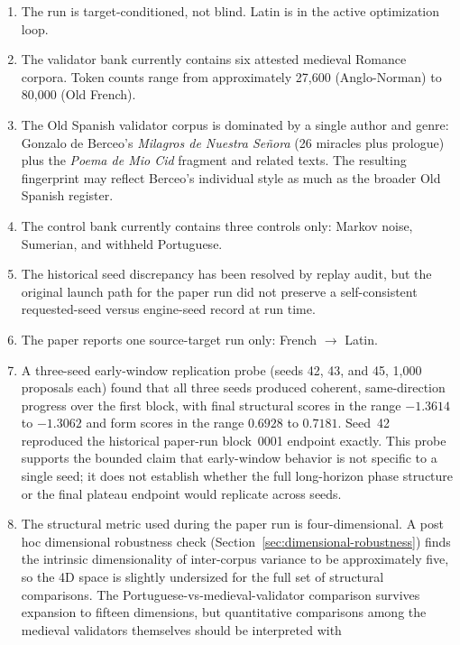 \documentclass[11pt]{article}
\begin{document}
\begin{enumerate}
    \item The run is target-conditioned, not blind. Latin is in the active
    optimization loop.
    \item The validator bank currently contains six attested medieval Romance
    corpora. Token counts range from approximately 27{,}600 (Anglo-Norman) to
    80{,}000 (Old French).
    \item The Old Spanish validator corpus is dominated by a single author
    and genre: Gonzalo de Berceo's \emph{Milagros de Nuestra Se\~nora}
    (26 miracles plus prologue) plus the \emph{Poema de Mio Cid} fragment
    and related texts. The resulting fingerprint may reflect Berceo's
    individual style as much as the broader Old Spanish register.
    \item The control bank currently contains three controls only: Markov
    noise, Sumerian, and withheld Portuguese.
    \item The historical seed discrepancy has been resolved by replay audit,
    but the original launch path for the paper run did not preserve a
    self-consistent requested-seed versus engine-seed record at run time.
    \item The paper reports one source-target run only: French $\rightarrow$
    Latin.
    \item A three-seed early-window replication probe (seeds 42, 43, and 45,
    1{,}000 proposals each) found that all three seeds produced coherent,
    same-direction progress over the first block, with final structural scores
    in the range $-1.3614$ to $-1.3062$ and form scores in the range $0.6928$
    to $0.7181$. Seed~42 reproduced the historical paper-run block~0001 endpoint
    exactly. This probe supports the bounded claim that early-window behavior
    is not specific to a single seed; it does not establish whether the full
    long-horizon phase structure or the final plateau endpoint would replicate
    across seeds.
    \item The structural metric used during the paper run is four-dimensional.
    A post hoc dimensional robustness check
    (Section~\ref{sec:dimensional-robustness}) finds the intrinsic
    dimensionality of inter-corpus variance to be approximately five, so the
    4D space is slightly undersized for the full set of structural
    comparisons. The Portuguese-vs-medieval-validator comparison
    survives expansion to fifteen dimensions, but quantitative comparisons
    among the medieval validators themselves should be interpreted with

\end{enumerate}
\end{document}

